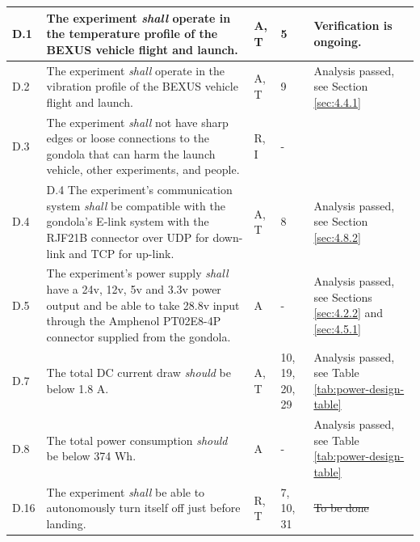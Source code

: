 \documentclass[a4paper,12pt,twoside]{article}
\providecommand{\DIFaddtex}[1]{{\protect\color{blue}\uwave{#1}}} %
\providecommand{\DIFdeltex}[1]{{\protect\color{red}\sout{#1}}}                      %
\providecommand{\DIFaddbegin}{} %
\providecommand{\DIFaddend}{} %
\providecommand{\DIFdelbegin}{} %
\providecommand{\DIFdelend}{} %
\providecommand{\DIFadd}[1]{\texorpdfstring{\DIFaddtex{#1}}{#1}} %
\providecommand{\DIFdel}[1]{\texorpdfstring{\DIFdeltex{#1}}{}} %
\newcommand{\DIFscaledelfig}{0.5}
\newlength{\DIFdelgraphicswidth} %
\newlength{\DIFdelgraphicsheight} %
\newcommand{\DIFaddincludegraphics}[2][]{{\color{blue}\fbox{\DIFOincludegraphics[#1]{#2}}}} %
\newcommand{\DIFdelincludegraphics}[2][]{%
\sbox{\DIFdelgraphicsbox}{\DIFOincludegraphics[#1]{#2}}%
\settoboxwidth{\DIFdelgraphicswidth}{\DIFdelgraphicsbox} %
\settoboxtotalheight{\DIFdelgraphicsheight}{\DIFdelgraphicsbox} %
\scalebox{\DIFscaledelfig}{%
\parbox[b]{\DIFdelgraphicswidth}{\usebox{\DIFdelgraphicsbox}\\[-\baselineskip] \rule{\DIFdelgraphicswidth}{0em}}\llap{\resizebox{\DIFdelgraphicswidth}{\DIFdelgraphicsheight}{%
\setlength{\unitlength}{\DIFdelgraphicswidth}%
\begin{picture}(1,1)%
\thicklines\linethickness{2pt} %
{\color[rgb]{1,0,0}\put(0,0){\framebox(1,1){}}}%
{\color[rgb]{1,0,0}\put(0,0){\line( 1,1){1}}}%
{\color[rgb]{1,0,0}\put(0,1){\line(1,-1){1}}}%
\end{picture}%
}\hspace*{3pt}}} %
} %
\DeclareRobustCommand{\DIFaddbegin}{\DIFOaddbegin \let\includegraphics\DIFaddincludegraphics} %
\DeclareRobustCommand{\DIFaddend}{\DIFOaddend \let\includegraphics\DIFOincludegraphics} %
\DeclareRobustCommand{\DIFdelbegin}{\DIFOdelbegin \let\includegraphics\DIFdelincludegraphics} %
\DeclareRobustCommand{\DIFdelend}{\DIFOaddend \let\includegraphics\DIFOincludegraphics} %
\begin{document}
\begin{longtable}[]{|m{}| m{} |m{} |m{}|m{}|}
D.1  & The experiment \textit{shall} operate in the temperature profile of the BEXUS vehicle flight and launch.\cite{BexusManual}                                                                         &       A, T       & 5            & Verification is ongoing.     \\ \hline
D.2  & The experiment \textit{shall} operate in the vibration profile of the BEXUS vehicle flight and launch.\cite{BexusManual}                                                                          &       A, T       & 9            &  Analysis passed, see Section \ref{sec:4.4.1}       \\ \hline
D.3  & The experiment \textit{shall} not have sharp edges or loose connections to the gondola that can harm the launch vehicle, other experiments, and people.                                                                                                           &      R, I      & -          &        \\ \hline %
D.4  & 
    \item[D.4] The experiment's communication system \textit{shall} be compatible with the gondola's E-link system with the RJF21B connector over UDP for down-link and TCP for up-link.                                                                             &      A, T        & 8            &    Analysis passed, see Section \ref{sec:4.8.2}    \\ \hline
D.5  & The experiment's power supply \textit{shall} have a 24v, 12v, 5v and 3.3v power output and be able to take 28.8v input through the Amphenol PT02E8-4P connector supplied from the gondola.                                                                                    &      A       &  -           & Analysis passed, see Sections \ref{sec:4.2.2} and \ref{sec:4.5.1}      \\ \hline
D.7  & The total DC current draw \textit{should} be below 1.8 A. &      A, T        & 10, 19, 20, 29\DIFaddbegin \DIFadd{, 33            }\DIFaddend & Analysis passed, see Table \ref{tab:power-design-table}\DIFaddbegin \DIFadd{, testing ongoing.        }\DIFaddend \\ \hline
D.8  & The total power consumption \textit{should} be below 374 Wh.& A & - & Analysis passed, see Table \ref{tab:power-design-table} \\ \hline
D.16 & The experiment \textit{shall} be able to autonomously turn itself off just before landing.                                                                                       &       R, T      &  7, 10, 31\DIFaddbegin \DIFadd{, 32           }\DIFaddend &   \DIFdelbegin \DIFdel{To be done    }\DIFdelend \DIFaddbegin \DIFadd{Testing ongoing    }\DIFaddend \\ \hline

\end{longtable}
\end{document}
